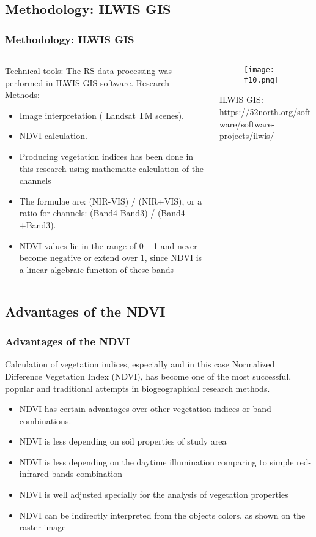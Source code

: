 \documentclass[pdflatex,compress,8pt,
	xcolor={dvipsnames,dvipsnames,svgnames,x11names,table},
	hyperref={colorlinks = true,breaklinks = true, urlcolor = NavyBlue, breaklinks = true}]{beamer}
\begin{document}
\subsection{Methodology: ILWIS GIS}
\begin{frame}\frametitle{Methodology: ILWIS GIS}
\begin{minipage}[0.4\textheight]{\textwidth}
\begin{columns}[T]
\begin{column}{0.5\textwidth}
Technical tools: The RS data processing was performed in ILWIS GIS software.
Research Methods: 
\begin{itemize}
	\item Image interpretation ( Landsat TM scenes).
	\item NDVI calculation.
	\item Producing vegetation indices has been done in this research using mathematic calculation of the channels
	\item The formulae are: (NIR-VIS) / (NIR+VIS), or a ratio for channels: (Band4-Band3) / (Band4 +Band3).
	\item NDVI values lie in the range of 0 – 1 and never become negative or extend over 1, since NDVI is a linear algebraic function of these bands
\end{itemize}
\end{column}
\begin{column}{0.5\textwidth}
\begin{figure}[H]
	\centering
		\texttt{[image: f10.png]}
\end{figure}
ILWIS GIS: https://52north.org/software/software-projects/ilwis/
\end{column}
\end{columns}
\end{minipage}
\end{frame}

\subsection{Advantages of the NDVI}
\begin{frame}\frametitle{Advantages of the NDVI}
Calculation of vegetation indices, especially and in this case Normalized Difference Vegetation Index (NDVI), has become one of the most successful, popular and traditional attempts in biogeographical research methods.
\begin{itemize}
            \item NDVI has certain advantages over other vegetation indices or band combinations.
            \item NDVI is less depending on soil properties of study area
            \item NDVI is less depending on the daytime illumination comparing to simple red-infrared bands combination
            \item NDVI is well adjusted specially for the analysis of vegetation properties
            \item NDVI can be indirectly interpreted from the objects colors, as shown on the raster image
\end{itemize}
\end{frame}
\end{document}
